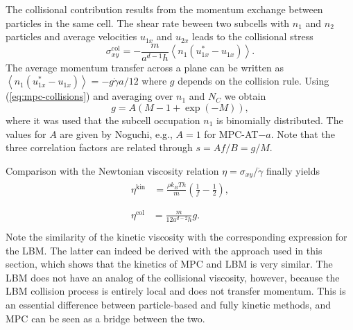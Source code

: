 \documentclass[8.5pt,twoside,twocolumn]{article}
\begin{document}
The collisional contribution results from the momentum exchange between particles in the same cell. The shear rate beween two subcells with $n_1$ and $n_2$ particles and average velocities $u_{1x}$ and $u_{2x}$ leads to the collisional stress
%
%
%
\begin{equation}
\sigma^\text{col}_{xy} = - \frac{m}{a^{d-1} h} \left\langle n_1 \left( u_{1x}^* - u_{1x} \right) \right\rangle .
\end{equation}
%
The average momentum transfer across a plane can be written as $\left\langle n_1 \left( u_{1x}^* - u_{1x} \right) \right\rangle = - g \dot{\gamma} a/12$ where $g$ depends on the collision rule. Using (\ref{eq:mpc-collisions}) and averaging over $n_1$ and $N_C$ we obtain
%
\begin{equation}
g %
= A \left( M-1+\exp(-M) \right)
,
\end{equation}
%
where it was used that the subcell occupation $n_1$ is binomially distributed. The values for $A$ are given by Noguchi\cite{Noguchi:2008}, e.g., $A=1$ for MPC-AT$-a$. Note that the three correlation factors are related through $s=Af/B = g/M$.

Comparison with the Newtonian viscosity relation $\eta=\sigma_{xy}/\dot{\gamma}$ finally yields
%
\begin{align}
  \begin{split}
    \eta^\text{kin} &= \frac{\rho k_BT h}{m} \left( \frac{1}{f} - \frac{1}{2} \right) , \\
  \end{split}\\
  \begin{split}
  \eta^\text{col} &= \frac{m}{12 a^{d-2} h} g . \\%
  \end{split}
\end{align}
%
Note the similarity of the kinetic viscosity with the corresponding expression for the LBM. The latter can indeed be derived with the approach used in this section, which shows that the kinetics of MPC and LBM is very similar. The LBM does not have an analog of the collisional viscosity, however, because the LBM collision process is entirely local and does not transfer momentum. This is an essential difference between particle-based and fully kinetic methods, and MPC can be seen as a bridge between the two.
\end{document}

